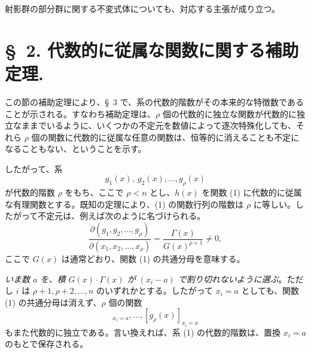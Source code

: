 \documentclass[11pt]{jlreq}
\begin{document}
射影群の部分群に関する不変式体についても、対応する主張が成り立つ。

\section*{\S\ 2. 代数的に従属な関数に関する補助定理.}

この節の補助定理により、\S\ 3 で、系の代数的階数がその本来的な特徴数であることが示される。すなわち補助定理は、$\rho$ 個の代数的に独立な関数が代数的に独立なままでいるように、いくつかの不定元を数値によって逐次特殊化しても、それら $\rho$ 個の関数に代数的に従属な任意の関数は、恒等的に消えることも不定になることもない、ということを示す。

したがって、系
\begin{equation}
  g_1(x),\ g_2(x),\ldots,g_\rho(x)
\tag{1}
\end{equation}
が代数的階数 $\rho$ をもち、ここで $\rho<n$ とし、$h(x)$ を関数 (1) に代数的に従属な有理関数とする。既知の定理により、(1) の関数行列の階数は $\rho$ に等しい。したがって不定元は、例えば次のように名づけられる。
\begin{equation}
 \frac{\partial(g_1,g_2,\ldots,g_\rho)}{\partial(x_1,x_2,\ldots,x_\rho)}
 =\frac{\Gamma(x)}{G(x)^{\rho+1}}\ne0,
\tag{2}
\end{equation}
ここで $G(x)$ は通常どおり、関数 (1) の共通分母を意味する。

\emph{いま数 $a$ を、積 $G(x)\cdot\Gamma(x)$ が $(x_i-a)$ で割り切れないように選ぶ}。ただし $i$ は $\rho+1,\rho+2,\ldots,n$ のいずれかとする。したがって $x_i=a$ としても、関数 (1) の共通分母は消えず、$\rho$ 個の関数
\begin{equation}
  [g_1(x)]_{x_i=a},\ldots,[g_\rho(x)]_{x_i=a}
\tag{3}
\end{equation}
もまた代数的に独立である。言い換えれば、系 (1) の代数的階数は、置換 $x_i=a$ のもとで保存される。
\end{document}
